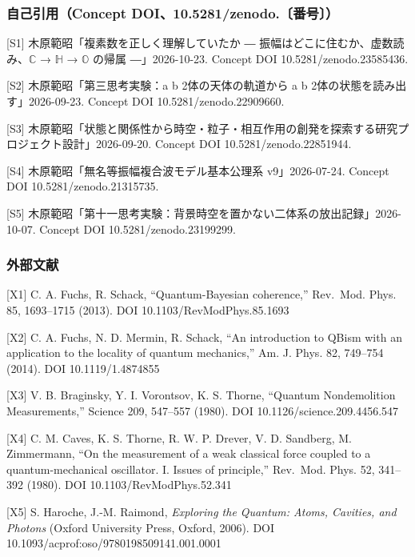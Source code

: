 \documentclass[
  a4paper,
]{ltjsarticle}
\begin{document}
\subsubsection{自己引用（Concept
DOI、10.5281/zenodo.〔番号〕）}\label{ux81eaux5df1ux5f15ux7528concept-doi10.5281zenodo.ux756aux53f7}

{[}S1{]} 木原範昭「複素数を正しく理解していたか ―
振幅はどこに住むか、虚数読み、\(\mathbb{C}\) → \(\mathbb{H}\) →
\(\mathbb{O}\) の帰属 ―」2026-10-23. Concept DOI
10.5281/zenodo.23585436.

{[}S2{]} 木原範昭「第三思考実験：a b 2体の天体の軌道から a b
2体の状態を読み出す」2026-09-23. Concept DOI 10.5281/zenodo.22909660.

{[}S3{]}
木原範昭「状態と関係性から時空・粒子・相互作用の創発を探索する研究プロジェクト設計」2026-09-20.
Concept DOI 10.5281/zenodo.22851944.

{[}S4{]} 木原範昭「無名等振幅複合波モデル基本公理系 v9」2026-07-24.
Concept DOI 10.5281/zenodo.21315735.

{[}S5{]}
木原範昭「第十一思考実験：背景時空を置かない二体系の放出記録」2026-10-07.
Concept DOI 10.5281/zenodo.23199299.

\subsubsection{外部文献}\label{ux5916ux90e8ux6587ux732e}

{[}X1{]} C. A. Fuchs, R. Schack, ``Quantum-Bayesian coherence,''
Rev.~Mod. Phys. 85, 1693--1715 (2013). DOI 10.1103/RevModPhys.85.1693

{[}X2{]} C. A. Fuchs, N. D. Mermin, R. Schack, ``An introduction to
QBism with an application to the locality of quantum mechanics,'' Am. J.
Phys. 82, 749--754 (2014). DOI 10.1119/1.4874855

{[}X3{]} V. B. Braginsky, Y. I. Vorontsov, K. S. Thorne, ``Quantum
Nondemolition Measurements,'' Science 209, 547--557 (1980). DOI
10.1126/science.209.4456.547

{[}X4{]} C. M. Caves, K. S. Thorne, R. W. P. Drever, V. D. Sandberg, M.
Zimmermann, ``On the measurement of a weak classical force coupled to a
quantum-mechanical oscillator. I. Issues of principle,'' Rev.~Mod. Phys.
52, 341--392 (1980). DOI 10.1103/RevModPhys.52.341

{[}X5{]} S. Haroche, J.-M. Raimond, \emph{Exploring the Quantum: Atoms,
Cavities, and Photons} (Oxford University Press, Oxford, 2006). DOI
10.1093/acprof:oso/9780198509141.001.0001
\end{document}
